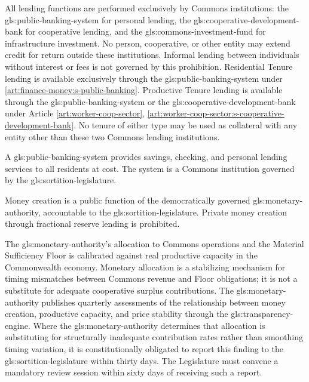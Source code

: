 All lending functions are performed exclusively by Commons institutions: the \gls{gls:public-banking-system} for personal lending, the \gls{gls:cooperative-development-bank} for cooperative lending, and the \gls{gls:commons-investment-fund} for infrastructure investment. No person, cooperative, or other entity may extend credit for return outside these institutions. Informal lending between individuals without interest or fees is not governed by this prohibition. Residential Tenure lending is available exclusively through the \gls{gls:public-banking-system} under \ref{art:finance-money:s-public-banking}. Productive Tenure lending is available through the \gls{gls:public-banking-system} or the \gls{gls:cooperative-development-bank} under Article \ref{art:worker-coop-sector}, \ref{art:worker-coop-sector:s-cooperative-development-bank}. No tenure of either type may be used as collateral with any entity other than these two Commons lending institutions.

A \gls{gls:public-banking-system} provides savings, checking, and personal lending services to all residents at cost. The system is a Commons institution governed by the \gls{gls:sortition-legislature}.

Money creation is a public function of the democratically governed \gls{gls:monetary-authority}, accountable to the \gls{gls:sortition-legislature}. Private money creation through fractional reserve lending is prohibited.

The \gls{gls:monetary-authority}'s allocation to Commons operations and the Material Sufficiency Floor is calibrated against real productive capacity in the Commonwealth economy. Monetary allocation is a stabilizing mechanism for timing mismatches between Commons revenue and Floor obligations; it is not a substitute for adequate cooperative surplus contributions. The \gls{gls:monetary-authority} publishes quarterly assessments of the relationship between money creation, productive capacity, and price stability through the \gls{gls:transparency-engine}. Where the \gls{gls:monetary-authority} determines that allocation is substituting for structurally inadequate contribution rates rather than smoothing timing variation, it is constitutionally obligated to report this finding to the \gls{gls:sortition-legislature} within thirty days. The Legislature must convene a mandatory review session within sixty days of receiving such a report.

